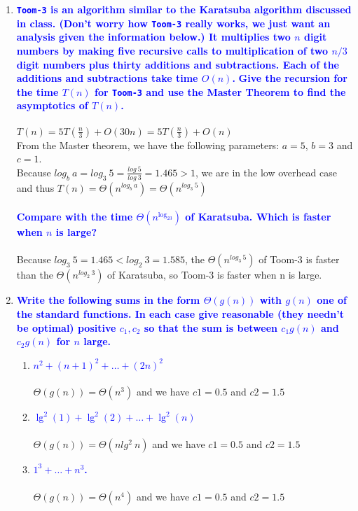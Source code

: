 \documentclass[11pt]{article}
\begin{document}
\begin{enumerate}
\item  \textbf{\textcolor{blue}{{\tt Toom-3} is an algorithm similar to the 
Karatsuba algorithm discussed in class.  (Don't worry how
{\tt Toom-3} really works, we just want an analysis given the
information below.)
It multiplies two $n$ digit numbers by making five recursive calls
to multiplication of two $n/3$ digit numbers plus thirty additions
and subtractions.  Each of the additions and subtractions take
time $O(n)$.}}
    \newline
    \textbf{\textcolor{blue}{Give the recursion for the time $T(n)$ for {\tt Toom-3} and
    use the Master Theorem to find the asymptotics of $T(n)$.}}
        \\\\ $T(n) = 5T(\frac{n}{3}) + O(30n) = 5T(\frac{n}{3}) + O(n)$
        \\ From the Master theorem, we have the following parameters: $a = 5$, $b = 3$ and $c = 1$.
        \\ Because $log_b\ a = log_3\ 5 = \frac{log\ 5}{log\ 3} = 1.465 > 1$, we are in the low overhead case and thus $T(n) = \Theta(n^{log_b\ a}) = \Theta(n^{log_3\ 5})$ \\\\
    \textbf{\textcolor{blue}{Compare with the time $\Theta(n^{\log_23})$ of Karatsuba.  Which is faster when $n$
    is large?}}
        \\\\ Because $log_3\ 5 = 1.465 < log_2\ 3 = 1.585$, the $\Theta(n^{log_3\ 5})$ of Toom-3 is faster than the $\Theta(n^{log_2\ 3})$ of Karatsuba, so Toom-3 is faster when n is large. \\

\item \textbf{\textcolor{blue}{Write the following sums in the form $\Theta(g(n))$ with $g(n)$
one of the standard functions.  
In each case give reasonable (they
needn't be optimal) positive $c_1,c_2$ so that the sum is between
$c_1g(n)$ and $c_2g(n)$ for $n$ large.}}
    \begin{enumerate}
    \item \textbf{\textcolor{blue}{$n^2+(n+1)^2+\ldots + (2n)^2$}}
        \\\\ $\Theta(g(n)) = \Theta(n^3)$ and we have $c1 = 0.5$ and $c2 = 1.5$ \\
    \item \textbf{\textcolor{blue}{$\lg^2(1)+\lg^2(2)+\ldots + \lg^2(n)$}}
        \\\\ $\Theta(g(n)) = \Theta(nlg^{2}\ n)$ and we have $c1 = 0.5$ and $c2 = 1.5$ \\
    \item \textbf{\textcolor{blue}{$1^3+\ldots+n^3$.}}
        \\\\ $\Theta(g(n)) = \Theta(n^4)$ and we have $c1 = 0.5$ and $c2 = 1.5$ \\
    \end{enumerate}



\end{enumerate}
\end{document}
